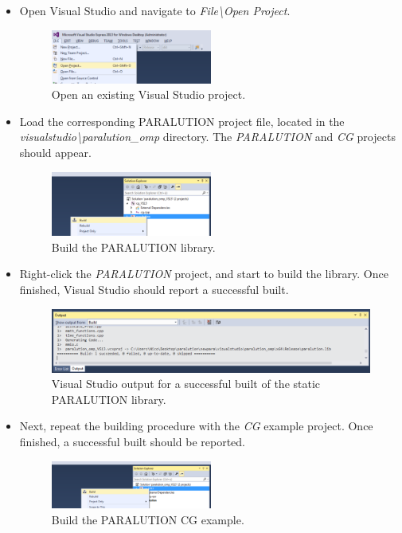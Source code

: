 \begin{itemize}

  \item Open Visual Studio and navigate to \emph{File\textbackslash Open Project}.
  \begin{figure}[!ht]
  \centering
  \includegraphics[width=0.5\textwidth]{./fig/visualstudio/vs_1.pdf}
  \caption{Open an existing Visual Studio project.}
  \label{vs1}
  \end{figure}

  \item Load the corresponding PARALUTION project file, located in the \emph{visualstudio\textbackslash paralution\_omp} directory. The \emph{PARALUTION} and \emph{CG} projects should appear.
  \begin{figure}[!ht]
  \centering
  \includegraphics[width=0.5\textwidth]{./fig/visualstudio/vs_2.pdf}
  \caption{Build the PARALUTION library.}
  \label{vs2}
  \end{figure}

  \item Right-click the \emph{PARALUTION} project, and start to build the library. Once finished, Visual Studio should report a successful built.
  \begin{figure}[!ht]
  \centering
  \includegraphics[width=1.0\textwidth]{./fig/visualstudio/vs_3.pdf}
  \caption{Visual Studio output for a successful built of the static PARALUTION library.}
  \label{vs3}
  \end{figure}

  \item Next, repeat the building procedure with the \emph{CG} example project. Once finished, a successful built should be reported.
  \begin{figure}[!ht]
  \centering
  \includegraphics[width=0.5\textwidth]{./fig/visualstudio/vs_4.pdf}
  \caption{Build the PARALUTION CG example.}
  \label{vs4}
  \end{figure}


\end{itemize}
